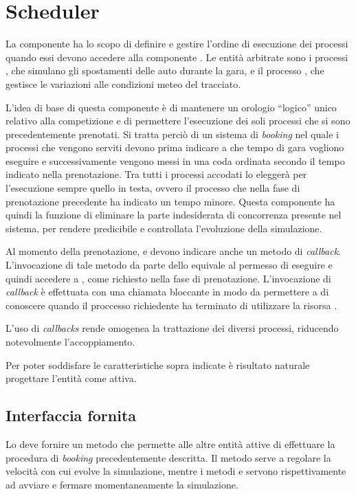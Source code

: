 \section{Scheduler}
\label{sec:scheduler}
La componente \sched{} ha lo scopo di definire e gestire l'ordine di esecuzione dei processi quando essi devono accedere alla componente \track{}.
Le entità arbitrate sono i processi \car{}, che simulano gli spostamenti delle auto durante la gara, e il processo \weather{}, che gestisce le variazioni alle condizioni meteo del tracciato.

L'idea di base di questa componente è di mantenere un orologio ``logico'' unico relativo alla competizione e di permettere l'esecuzione dei soli processi che si sono precedentemente prenotati. Si tratta perciò di un sistema di \textit{booking} nel quale i processi che vengono serviti devono prima indicare a che tempo di gara vogliono eseguire e successivamente vengono messi in una coda ordinata secondo il tempo indicato nella prenotazione. Tra tutti i processi accodati lo \sched{} eleggerà per l'esecuzione sempre quello in testa, ovvero il processo che nella fase di prenotazione precedente ha indicato un tempo minore. Questa componente ha quindi la funzione di eliminare la parte indesiderata di concorrenza presente nel sistema, per rendere predicibile e controllata l'evoluzione della simulazione.

Al momento della prenotazione, \car{} e \weather{} devono indicare anche un metodo di \textit{callback}. L'invocazione di tale metodo da parte dello \sched{} equivale al permesso di eseguire e quindi accedere a \track{}, come richiesto nella fase di prenotazione.
L'invocazione di \textit{callback} è effettuata con una chiamata bloccante in modo da permettere a \sched{} di conoscere quando il proccesso richiedente ha terminato di utilizzare la risorsa \track{}.

L'uso di \textit{callbacks} rende omogenea la trattazione dei diversi processi, riducendo notevolmente l'accoppiamento.

Per poter soddisfare le caratteristiche sopra indicate è risultato naturale progettare l'entità \sched{} come attiva.

\subsection*{Interfaccia fornita}
Lo \sched{} deve fornire un metodo  che permette alle altre entità attive di effettuare la procedura di \textit{booking} precedentemente descritta.
Il metodo  serve a regolare la velocità con cui evolve la simulazione, mentre i metodi  e  servono rispettivamente ad avviare e fermare momentaneamente la simulazione.

